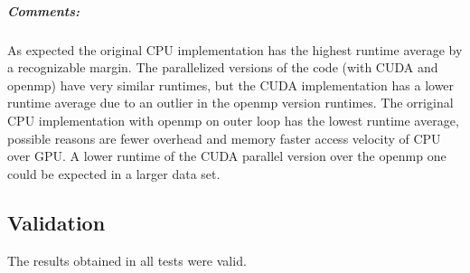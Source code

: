 \subparagraph{Comments:} As expected the original CPU implementation has the highest runtime average by a recognizable margin. The parallelized versions of the code (with CUDA and openmp) have very similar runtimes, but the CUDA implementation has a lower runtime average due to an outlier in the openmp version runtimes. The orriginal CPU implementation with openmp on outer loop has the lowest runtime average, possible reasons are fewer overhead and memory faster access velocity of CPU over GPU. A lower runtime of the CUDA parallel version over the openmp one could be expected in a larger data set.

\subsection{Validation}
The results obtained in all tests were valid.
